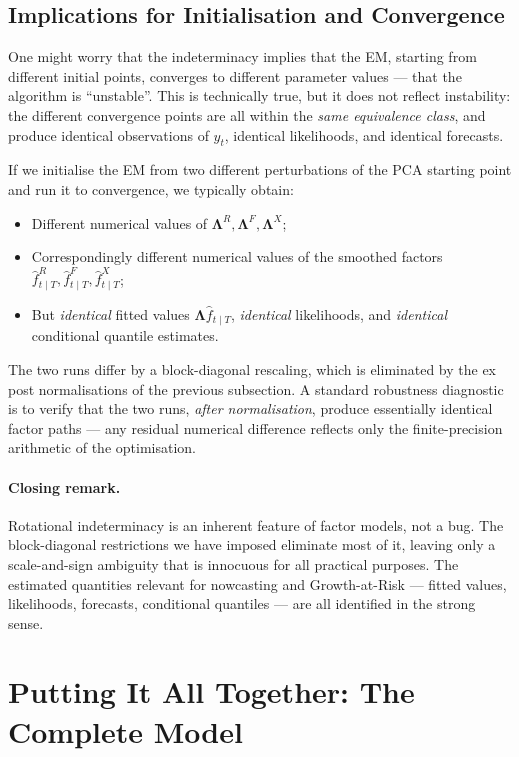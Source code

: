 \documentclass[11pt, a4paper, oneside]{article}
\newcommand{\mL}{\boldsymbol{\Lambda}}
\begin{document}
\subsection{Implications for Initialisation and Convergence}

One might worry that the indeterminacy implies that the EM, starting
from different initial points, converges to different parameter
values — that the algorithm is ``unstable''. This is technically true,
but it does not reflect instability: the different convergence points
are all within the \emph{same equivalence class}, and produce
identical observations of $y_t$, identical likelihoods, and identical
forecasts.

If we initialise the EM from two different perturbations of the PCA
starting point and run it to
convergence, we typically obtain:
\begin{itemize}[leftmargin=1.5em, itemsep=2pt]
    \item Different numerical values of $\mL^R, \mL^F, \mL^X$;
    \item Correspondingly different numerical values of the smoothed
          factors $\hat{f}^R_{t \mid T}, \hat{f}^F_{t \mid T}, \hat{f}^X_{t \mid T}$;
    \item But \emph{identical} fitted values $\mL \hat{f}_{t \mid T}$,
          \emph{identical} likelihoods, and \emph{identical} conditional
          quantile estimates.
\end{itemize}
The two runs differ by a block-diagonal rescaling, which is eliminated
by the ex post normalisations of the previous subsection. A standard
robustness diagnostic is to verify that the two runs, \emph{after
normalisation}, produce essentially identical factor paths — any
residual numerical difference reflects only the finite-precision
arithmetic of the optimisation.

\paragraph{Closing remark.}
Rotational indeterminacy is an inherent feature of factor models, not
a bug. The block-diagonal restrictions we have imposed eliminate most
of it, leaving only a scale-and-sign ambiguity that is innocuous for
all practical purposes. The estimated quantities relevant for
nowcasting and Growth-at-Risk — fitted values, likelihoods, forecasts,
conditional quantiles — are all identified in the strong sense.

\newpage 

\section{Putting It All Together: The Complete Model}
\label{sec:putting-it-together}
\end{document}
